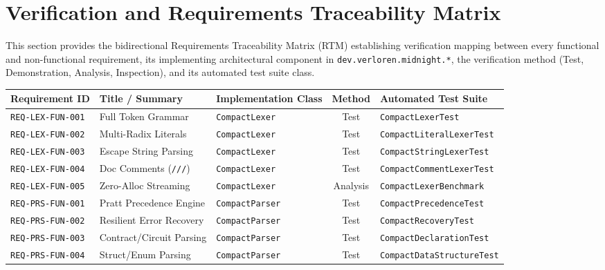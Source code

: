 \section{Verification and Requirements Traceability Matrix}
\label{sec:traceability_matrix}

This section provides the bidirectional Requirements Traceability Matrix (RTM) establishing verification mapping between every functional and non-functional requirement, its implementing architectural component in \texttt{dev.verloren.midnight.*}, the verification method (Test, Demonstration, Analysis, Inspection), and its automated test suite class.

\begin{table}[htbp]
    \centering
    \scriptsize
    \begin{tabularx}{\textwidth}{l p{3.2cm} p{3.8cm} c p{3.2cm}}
        \toprule
        \textbf{Requirement ID} & \textbf{Title / Summary} & \textbf{Implementation Class} & \textbf{Method} & \textbf{Automated Test Suite} \\
        \midrule
        \texttt{REQ-LEX-FUN-001} & Full Token Grammar & \texttt{CompactLexer} & Test & \texttt{CompactLexerTest} \\
        \texttt{REQ-LEX-FUN-002} & Multi-Radix Literals & \texttt{CompactLexer} & Test & \texttt{CompactLiteralLexerTest} \\
        \texttt{REQ-LEX-FUN-003} & Escape String Parsing & \texttt{CompactLexer} & Test & \texttt{CompactStringLexerTest} \\
        \texttt{REQ-LEX-FUN-004} & Doc Comments (\texttt{///}) & \texttt{CompactLexer} & Test & \texttt{CompactCommentLexerTest} \\
        \texttt{REQ-LEX-FUN-005} & Zero-Alloc Streaming & \texttt{CompactLexer} & Analysis & \texttt{CompactLexerBenchmark} \\
        \midrule
        \texttt{REQ-PRS-FUN-001} & Pratt Precedence Engine & \texttt{CompactParser} & Test & \texttt{CompactPrecedenceTest} \\
        \texttt{REQ-PRS-FUN-002} & Resilient Error Recovery & \texttt{CompactParser} & Test & \texttt{CompactRecoveryTest} \\
        \texttt{REQ-PRS-FUN-003} & Contract/Circuit Parsing & \texttt{CompactParser} & Test & \texttt{CompactDeclarationTest} \\
        \texttt{REQ-PRS-FUN-004} & Struct/Enum Parsing & \texttt{CompactParser} & Test & \texttt{CompactDataStructureTest} \\

\end{tabularx}
\end{table}
